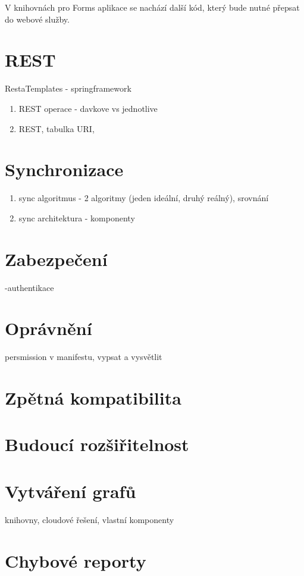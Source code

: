\documentclass{bakalarka}
\begin{document}
V knihovnách pro Forms aplikace se nachází další kód, který bude nutné přepsat do webové služby.
\section{REST}
RestaTemplates - springframework
\begin{enumerate}
\item REST operace - davkove vs jednotlive
\item REST, tabulka URI, 
\end{enumerate}

\section{Synchronizace}
\begin{enumerate}
\item sync algoritmus - 2 algoritmy (jeden ideální, druhý reálný), srovnání
\item sync architektura - komponenty
\end{enumerate}

\section{Zabezpečení}
-authentikace

\section{Oprávnění}
persmission v manifestu, vypsat a vysvětlit


\section{Zpětná kompatibilita}

\section{Budoucí rozšiřitelnost}

\section{Vytváření grafů}
knihovny, cloudové řešení, vlastní komponenty

\section{Chybové reporty}
\end{document}

